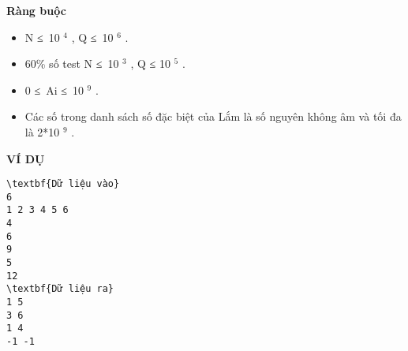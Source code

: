 \textbf{Ràng buộc
}
\begin{itemize}
	\item N ≤ 10 $^ 4 $ , Q ≤ 10 $^ 6 $ .
	\item 60\% số test N ≤ 10 $^ 3 $ , Q ≤ 10 $^ 5 $ .
	\item 0 ≤ Ai ≤ 10 $^ 9 $ .
	\item Các số trong danh sách số đặc biệt của Lắm là số nguyên không âm và tối đa là 2*10 $^ 9 $ .
\end{itemize}
\textbf{VÍ DỤ
}
\begin{verbatim}
\textbf{Dữ liệu vào}
6
1 2 3 4 5 6
4
6
9
5
12
\textbf{Dữ liệu ra}
1 5
3 6
1 4
-1 -1
\end{verbatim}